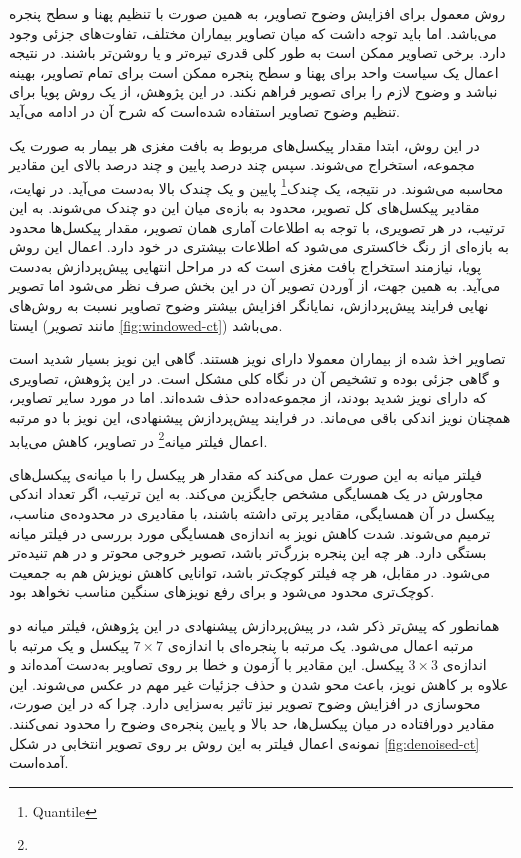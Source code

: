 روش معمول برای افزایش وضوح تصاویر، به همین صورت با تنظیم پهنا و سطح پنجره می‌باشد.
اما باید توجه داشت که میان تصاویر بیماران مختلف، تفاوت‌های جزئی وجود دارد.
برخی تصاویر ممکن است به طور کلی قدری تیره‌تر و یا روشن‌تر باشند.
در نتیجه اعمال یک سیاست واحد برای پهنا و سطح پنجره ممکن است برای تمام تصاویر، بهینه نباشد و وضوح لازم را برای تصویر فراهم نکند.
در این پژوهش، از یک روش پویا برای تنظیم وضوح تصاویر استفاده شده‌است که شرح آن در ادامه می‌آید.

در این روش، ابتدا مقدار پیکسل‌های مربوط به بافت مغزی هر بیمار به صورت یک مجموعه، استخراج می‌شوند.
سپس چند درصد پایین و چند درصد بالای این مقادیر محاسبه می‌شوند.
در نتیجه، یک 
چندک\footnote{Quantile} 
پایین و یک چندک بالا به‌دست می‌آید.
در نهایت، مقادیر پیکسل‌های کل تصویر، محدود به بازه‌ی میان این دو چندک می‌شوند.
به این ترتیب، در هر تصویری، با توجه به اطلاعات آماری همان تصویر، 
مقدار پیکسل‌ها محدود به بازه‌ای از رنگ خاکستری می‌شود که اطلاعات بیشتری در خود دارد.
اعمال این روش پویا، نیازمند استخراج بافت مغزی است که در مراحل انتهایی پیش‌پردازش به‌دست می‌آید.
به همین جهت، از آوردن تصویر آن در این بخش صرف نظر می‌شود
اما تصویر نهایی فرایند پیش‌پردازش، نمایانگر افزایش بیشتر وضوح 
تصاویر نسبت به روش‌های ایستا (مانند تصویر \ref{fig:windowed-ct}) می‌باشد.


تصاویر اخذ شده از بیماران معمولا دارای نویز هستند.
گاهی این نویز بسیار شدید است و گاهی جزئی بوده و تشخیص آن در نگاه کلی مشکل است.
در این پژوهش، تصاویری که دارای نویز شدید بودند، از مجموعه‌داده حذف شده‌اند.
اما در مورد سایر تصاویر، همچنان نویز اندکی باقی می‌ماند.
در فرایند پیش‌پردازش پیشنهادی، این نویز با دو مرتبه اعمال 
فیلتر میانه\footnote{}
در تصاویر، کاهش می‌یابد.

فیلتر میانه به این صورت عمل می‌کند که مقدار هر پیکسل را 
با میانه‌ی پیکسل‌های مجاورش در یک همسایگی مشخص جایگزین می‌کند.
به این ترتیب، اگر تعداد اندکی پیکسل در آن همسایگی، مقادیر پرتی داشته باشند، با مقادیری در محدوده‌ی مناسب، ترمیم می‌شوند.
شدت کاهش نویز به اندازه‌ی همسایگی مورد بررسی در فیلتر میانه بستگی دارد.
هر چه این پنجره بزرگ‌تر باشد، تصویر خروجی محو‌تر و در هم تنیده‌تر
می‌شود.
در مقابل، هر چه فیلتر کوچک‌تر باشد، توانایی کاهش نویزش هم به جمعیت کوچک‌تری محدود می‌شود و برای رفع نویز‌های سنگین مناسب نخواهد بود.

همانطور که پیش‌تر ذکر شد، در پیش‌پردازش پیشنهادی در این پژوهش، فیلتر میانه دو مرتبه اعمال می‌شود. 
یک مرتبه با پنجره‌ای با اندازه‌ی $7 \times 7$ پیکسل و یک مرتبه با اندازه‌ی $3 \times 3$ پیکسل.
این مقادیر با آزمون و خطا بر روی تصاویر به‌دست آمده‌اند و علاوه بر کاهش نویز، باعث محو شدن و حذف جزئیات غیر مهم در عکس می‌شوند.
این محو‌سازی در افزایش وضوح تصویر نیز تاثیر به‌سزایی دارد.
چرا که در این صورت، مقادیر دورافتاده در میان پیکسل‌ها، حد بالا و پایین پنجره‌ی وضوح را محدود نمی‌کنند.
نمونه‌ی اعمال فیلتر به این روش بر روی تصویر انتخابی 
در شکل
\ref{fig:denoised-ct}
آمده‌است.

